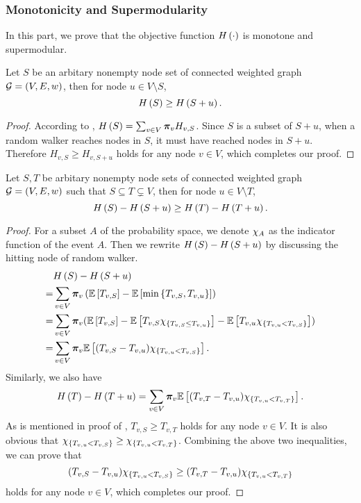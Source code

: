 \documentclass[sigconf]{acmart}
\begin{document}
\subsubsection{Monotonicity and Supermodularity}

In this part, we prove that the objective function \(H\left(\cdot\right)\) is monotone and supermodular.
\begin{theorem}[Monotonicity]\label{thm:mono}
  Let \(S\) be an arbitary nonempty node set of connected weighted graph \(\mathcal{G}=(V,E,w)\), then for node \(u\in V\setminus S\),
  \[H\left(S\right)\ge H\left(S+u\right).\]
\end{theorem}

\begin{proof}
  According to , \(H\left(S\right)=\sum_{v\in V}\boldsymbol{\pi}_vH_{v,S}\).
  Since \(S\) is a subset of \(S+u\), when a random walker reaches nodes in \(S\), it must have reached nodes in \(S+u\). Therefore \(H_{v,S}\ge H_{v,S+u}\) holds for any node \(v\in V\), which completes our proof.
\end{proof}

\begin{theorem}[Supermodularity]\label{thm:supermod}
  Let \(S,T\) be arbitary nonempty node sets of connected weighted graph \(\mathcal{G}=(V,E,w)\) such that \(S\subseteq T\subsetneq V\), then for node \(u\in V\setminus T\),
  \[H\left(S\right)-H\left(S+u\right)\ge H\left(T\right)-H\left(T+u\right).\]
\end{theorem}

\begin{proof}
  For a subset \(A\) of the probability space, we denote \(\chi_{A}\) as the indicator function of the event \(A\). Then we rewrite \(H\left(S\right)-H\left(S+u\right)\) by discussing the hitting node of random walker.
  \begin{align*}
      & H\left(S\right)-H\left(S+u\right)                                                                                                                      \\
    = & \sum_{v\in V}\boldsymbol{\pi}_v\left( \mathbb{E}\left[T_{v,S}\right]-\mathbb{E}\left[\min\left\{T_{v,S},T_{v,u} \right\}\right] \right)                                                           \\
    = & \sum_{v\in V}\boldsymbol{\pi}_v(\mathbb{E}\left[T_{v,S}\right]-\mathbb{E}\left[T_{v,S}\chi_{\left\{T_{v,S}\le T_{v,u} \right\}}\right]-\mathbb{E}\left[T_{v,u}\chi_{\left\{T_{v,u}<T_{v,S} \right\}}\right]) \\
    = & \sum_{v\in V}\boldsymbol{\pi}_v\mathbb{E}\left[(T_{v,S}-T_{v,u})\chi_{\left\{T_{v,u}<T_{v,S} \right\}}\right].
  \end{align*}
  Similarly, we also have
  \[H\left(T\right)-H\left(T+u\right)=\sum_{v\in V}\boldsymbol{\pi}_v\mathbb{E}\left[(T_{v,T}-T_{v,u})\chi_{\left\{T_{v,u}<T_{v,T} \right\}}\right].\]
  As is mentioned in proof of , \(T_{v,S}\ge T_{v,T}\) holds for any node \(v\in V\).
  It is also obvious that \(\chi_{\left\{T_{v,u}<T_{v,S} \right\}}\ge\chi_{\left\{T_{v,u}<T_{v,T} \right\}}\).
  Combining the above two inequalities, we can prove that
  \[(T_{v,S}-T_{v,u})\chi_{\left\{T_{v,u}<T_{v,S} \right\}}\ge(T_{v,T}-T_{v,u})\chi_{\left\{T_{v,u}<T_{v,T} \right\}}\]
  holds for any node \(v\in V\), which completes our proof.
\end{proof}
\end{document}
